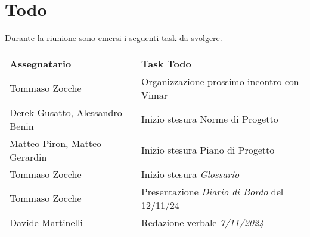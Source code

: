 \section{Todo}
Durante la riunione sono emersi i seguenti task da svolgere.

\begin{center}
  \begin{tabular}{|p{5cm}|p{8cm}|}
    \hline
    \textbf{Assegnatario}       & \textbf{Task Todo} \\ \hline
        Tommaso Zocche & Organizzazione prossimo incontro con Vimar \\ \hline
        Derek Gusatto, Alessandro Benin & Inizio stesura Norme di Progetto \\ \hline
        Matteo Piron, Matteo Gerardin & Inizio stesura Piano di Progetto \\ \hline
        Tommaso Zocche & Inizio stesura \textit{Glossario} \\ \hline
        Tommaso Zocche & Presentazione \textit{Diario di Bordo} del 12/11/24 \\ \hline
        Davide Martinelli & Redazione verbale \textit{7/11/2024} \\ \hline
  \end{tabular}
\end{center}